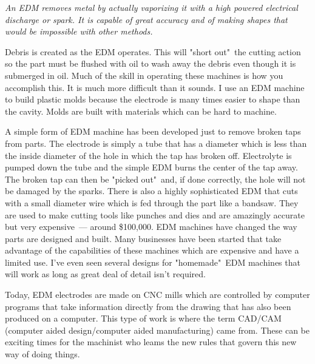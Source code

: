 \bigskip
\textit{An EDM removes metal by actually vaporizing it with a high powered
electrical discharge or spark. It is capable of great accuracy and of making
shapes that would be impossible with other methods.}
\bigskip

Debris is created as the EDM operates. This will "short out"\ the cutting action
so the part must be flushed with oil to wash away the debris even though it is
submerged in oil. Much of the skill in operating these machines is how you
accomplish this. It is much more difficult than it sounds. I use an EDM machine
to build plastic molds because the electrode is many times easier to shape than
the cavity. Molds are built with materials which can be hard to machine.


A simple form of EDM machine has been developed just to remove broken taps from
parts. The electrode is simply a tube that has a diameter which is less than the
inside diameter of the hole in which the tap has broken off. Electrolyte is
pumped down the tube and the simple EDM burns the center of the tap away. The
broken tap can then be "picked out"\ and, if done correctly, the hole will not be
damaged by the sparks. There is also a highly sophisticated EDM that cuts with a
small diameter wire which is fed through the part like a bandsaw. They are used
to make cutting tools like punches and dies and are amazingly accurate but very
expensive\ --- around \$100,000. EDM machines have changed the way parts are
designed and built. Many businesses have been started that take advantage of the
capabilities of these machines which are expensive and have a limited use. I've
even seen several designs for "homemade"\ EDM machines that will work as long as
great deal of detail isn't required.


Today, EDM electrodes are made on CNC mills which are controlled by computer
programs that take information directly from the drawing that has also been
produced on a computer. This type of work is where the term CAD/CAM (computer
aided design/computer aided manufacturing) came from. These can be exciting
times for the machinist who leams the new rules that govern this new way of
doing things.

\secup

\secdown


